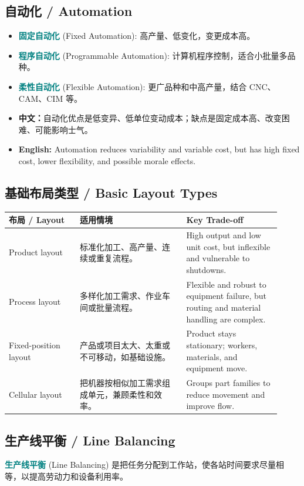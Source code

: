 \documentclass[11pt,a4paper]{ctexart}
\newcommand{\term}[2]{\textbf{\textcolor{Teal}{#1}} \textcolor{Muted}{(#2)}}
\newcommand{\cn}[1]{\textbf{中文：}#1}
\newcommand{\en}[1]{\textbf{English:} #1}
\begin{document}
\subsection{自动化 / Automation}
\begin{itemize}
  \item \term{固定自动化}{Fixed Automation}: 高产量、低变化，变更成本高。
  \item \term{程序自动化}{Programmable Automation}: 计算机程序控制，适合小批量多品种。
  \item \term{柔性自动化}{Flexible Automation}: 更广品种和中高产量，结合 CNC、CAM、CIM 等。
  \item \cn{自动化优点是低变异、低单位变动成本；缺点是固定成本高、改变困难、可能影响士气。}
  \item \en{Automation reduces variability and variable cost, but has high fixed cost, lower flexibility, and possible morale effects.}
\end{itemize}

\subsection{基础布局类型 / Basic Layout Types}
\begin{longtable}{L{0.24\linewidth}L{0.36\linewidth}L{0.32\linewidth}}
\toprule
\textbf{布局 / Layout} & \textbf{适用情境} & \textbf{Key Trade-off} \\
\midrule
Product layout & 标准化加工、高产量、连续或重复流程。 & High output and low unit cost, but inflexible and vulnerable to shutdowns. \\
Process layout & 多样化加工需求、作业车间或批量流程。 & Flexible and robust to equipment failure, but routing and material handling are complex. \\
Fixed-position layout & 产品或项目太大、太重或不可移动，如基础设施。 & Product stays stationary; workers, materials, and equipment move. \\
Cellular layout & 把机器按相似加工需求组成单元，兼顾柔性和效率。 & Groups part families to reduce movement and improve flow. \\
\bottomrule
\end{longtable}

\subsection{生产线平衡 / Line Balancing}
\term{生产线平衡}{Line Balancing} 是把任务分配到工作站，使各站时间要求尽量相等，以提高劳动力和设备利用率。
\end{document}
